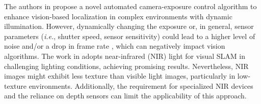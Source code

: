 

The authors in \cite{wang2022automated}  propose a novel automated camera-exposure control algorithm to enhance vision-based localization in complex environments with dynamic illumination. However, dynamically changing the exposure or, in general,  sensor parameters (\textit{i.e.}, shutter speed, sensor sensitivity) could lead to a higher level of noise and/or a drop in frame rate \cite{kim2020proactive}, which can negatively impact vision algorithms. The work in \cite{kong2021direct} adopts near-infrared (NIR) light for visual SLAM in challenging lighting conditions, achieving promising results. Nevertheless, NIR images might exhibit less texture than visible light images, particularly in low-texture environments. Additionally, the requirement for specialized NIR devices and the reliance on depth sensors can limit the applicability of this approach.


